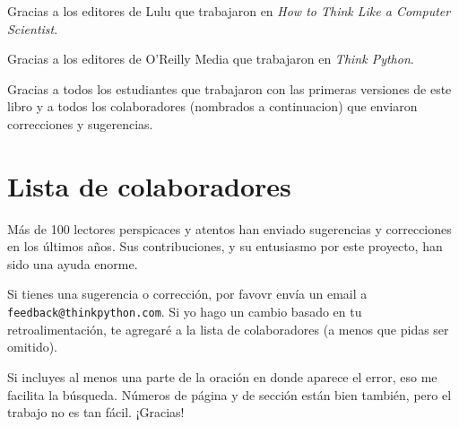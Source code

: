\documentclass[10pt]{book}
\begin{document}
Gracias a los editores de Lulu que trabajaron en
{\em How to Think Like a Computer Scientist}.

Gracias a los editores de O'Reilly Media que trabajaron en
{\em Think Python}.

Gracias a todos los estudiantes que trabajaron con las primeras
versiones de este libro y a todos los colaboradores (nombrados
a continuacion) que enviaron correcciones y sugerencias.


\section*{Lista de colaboradores}

Más de 100 lectores perspicaces y atentos han enviado
sugerencias y correcciones en los últimos años.  Sus
contribuciones, y su entusiasmo por este proyecto, han sido una
ayuda enorme.

Si tienes una sugerencia o corrección, por favovr envía un email a
{\tt feedback@thinkpython.com}.  Si yo hago un cambio basado en tu
retroalimentación, te agregaré a la lista de colaboradores
(a menos que pidas ser omitido).

Si incluyes al menos una parte de la oración en donde
aparece el error, eso me facilita la búsqueda.  Números de página
y de sección están bien también, pero el trabajo no es tan fácil.
¡Gracias!
\end{document}

